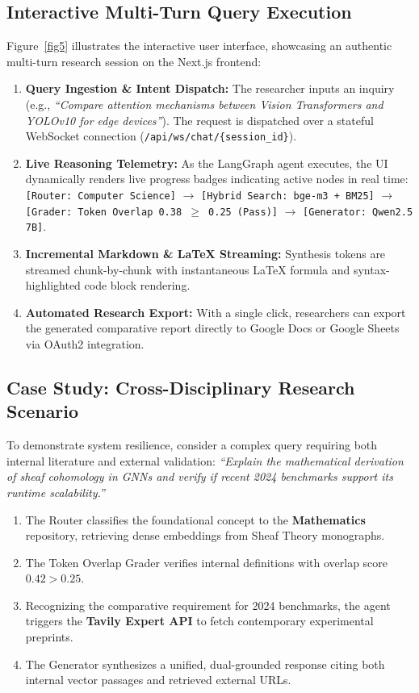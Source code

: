 \documentclass[conference]{IEEEtran}
\begin{document}
\subsection{Interactive Multi-Turn Query Execution}
Figure~\ref{fig5} illustrates the interactive user interface, showcasing an authentic multi-turn research session on the Next.js frontend:
\begin{enumerate}
    \item \textbf{Query Ingestion \& Intent Dispatch:} The researcher inputs an inquiry (e.g., \textit{``Compare attention mechanisms between Vision Transformers and YOLOv10 for edge devices''}). The request is dispatched over a stateful WebSocket connection (\texttt{/api/ws/chat/\{session\_id\}}).
    \item \textbf{Live Reasoning Telemetry:} As the LangGraph agent executes, the UI dynamically renders live progress badges indicating active nodes in real time: \texttt{[Router: Computer Science]} $\rightarrow$ \texttt{[Hybrid Search: bge-m3 + BM25]} $\rightarrow$ \texttt{[Grader: Token Overlap 0.38 $\ge$ 0.25 (Pass)]} $\rightarrow$ \texttt{[Generator: Qwen2.5 7B]}.
    \item \textbf{Incremental Markdown \& LaTeX Streaming:} Synthesis tokens are streamed chunk-by-chunk with instantaneous LaTeX formula and syntax-highlighted code block rendering.
    \item \textbf{Automated Research Export:} With a single click, researchers can export the generated comparative report directly to Google Docs or Google Sheets via OAuth2 integration.
\end{enumerate}

\subsection{Case Study: Cross-Disciplinary Research Scenario}
To demonstrate system resilience, consider a complex query requiring both internal literature and external validation: \textit{``Explain the mathematical derivation of sheaf cohomology in GNNs and verify if recent 2024 benchmarks support its runtime scalability.''}
\begin{enumerate}
    \item The Router classifies the foundational concept to the \textbf{Mathematics} repository, retrieving dense embeddings from Sheaf Theory monographs.
    \item The Token Overlap Grader verifies internal definitions with overlap score $0.42 > 0.25$.
    \item Recognizing the comparative requirement for 2024 benchmarks, the agent triggers the \textbf{Tavily Expert API} to fetch contemporary experimental preprints.
    \item The Generator synthesizes a unified, dual-grounded response citing both internal vector passages and retrieved external URLs.
\end{enumerate}
\end{document}
